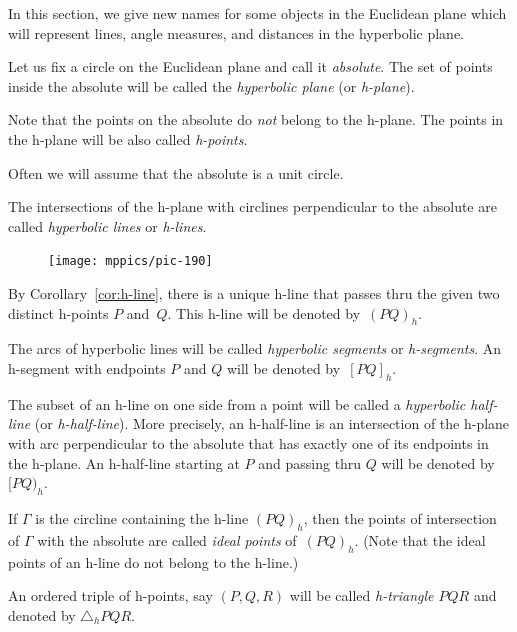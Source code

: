 In this section, we give new names for some objects in the Euclidean plane
which will represent lines, angle measures, and distances in the hyperbolic plane.

Let us fix a circle on the Euclidean plane 
and call it \emph{absolute}.
The set of points inside the absolute will be called the \emph{hyperbolic plane} (or \emph{h-plane}).

Note that the points on the absolute do {}\emph{not} belong to the h-plane.
The points in the h-plane will be also called \emph{h-points}.

Often we will assume that the absolute is a unit circle.



The intersections of the h-plane with circlines perpendicular to the absolute are called {}\emph{hyperbolic lines} or \emph{h-lines}.

\begin{figure}
\centering
\texttt{[image: mppics/pic-190]}
\end{figure}

By Corollary~\ref{cor:h-line}, there is a unique h-line that passes thru the given two distinct h-points $P$ and~$Q$.
This h-line will be denoted by~\index{62@$(PQ)_h$, $[PQ)_h$,$[PQ]_h$}$(PQ)_h$.

The arcs of hyperbolic lines will be called {}\emph{hyperbolic segments} or \emph{h-segments}.
An h-segment with endpoints $P$ and $Q$ will be denoted by~$[PQ]_h$.

The subset of an h-line on one side from a point will be called a {}\emph{hyperbolic half-line} (or \emph{h-half-line}).
More precisely, an h-half-line is an intersection of the h-plane with arc perpendicular to the absolute that has exactly one of its endpoints in the h-plane.
An h-half-line starting at $P$ and passing thru $Q$ will be denoted by~$[PQ)_h$.

If $\Gamma$ is the circline containing the h-line $(PQ)_h$, then the points of intersection of $\Gamma$ with the absolute are called 
\emph{ideal points} of~$(PQ)_h$.
(Note that the ideal points of an h-line do not belong to the h-line.)

An ordered triple of h-points, say $(P,Q,R)$ will be called \emph{h-triangle $PQR$} and denoted by $\triangle_h P Q R$.

